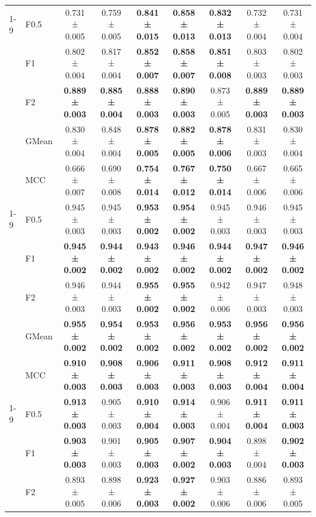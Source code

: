 \begin{table}[H]
{\begin{tabular}{llccccccc}
\cline{1-9}
\multirow[t]{5}{*}{GaussianNB} & F0.5 & 0.731 ± 0.005 & 0.759 ± 0.005 & \textbf{0.841 ± 0.015} & \textbf{0.858 ± 0.013} & \textbf{0.832 ± 0.013} & 0.732 ± 0.004 & 0.731 ± 0.004 \\
 & F1 & 0.802 ± 0.004 & 0.817 ± 0.004 & \textbf{0.852 ± 0.007} & \textbf{0.858 ± 0.007} & \textbf{0.851 ± 0.008} & 0.803 ± 0.003 & 0.802 ± 0.003 \\
 & F2 & \textbf{0.889 ± 0.003} & \textbf{0.885 ± 0.004} & \textbf{0.888 ± 0.003} & \textbf{0.890 ± 0.003} & 0.873 ± 0.005 & \textbf{0.889 ± 0.003} & \textbf{0.889 ± 0.003} \\
 & GMean & 0.830 ± 0.004 & 0.848 ± 0.004 & \textbf{0.878 ± 0.005} & \textbf{0.882 ± 0.005} & \textbf{0.878 ± 0.006} & 0.831 ± 0.003 & 0.830 ± 0.004 \\
 & MCC & 0.666 ± 0.007 & 0.690 ± 0.008 & \textbf{0.754 ± 0.014} & \textbf{0.767 ± 0.012} & \textbf{0.750 ± 0.014} & 0.667 ± 0.006 & 0.665 ± 0.006 \\
\cline{1-9}
\multirow[t]{5}{*}{LGBM()} & F0.5 & 0.945 ± 0.003 & 0.945 ± 0.003 & \textbf{0.953 ± 0.002} & \textbf{0.954 ± 0.002} & 0.945 ± 0.003 & 0.946 ± 0.003 & 0.945 ± 0.003 \\
 & F1 & \textbf{0.945 ± 0.002} & \textbf{0.944 ± 0.002} & \textbf{0.943 ± 0.002} & \textbf{0.946 ± 0.002} & \textbf{0.944 ± 0.002} & \textbf{0.947 ± 0.002} & \textbf{0.946 ± 0.002} \\
 & F2 & 0.946 ± 0.003 & 0.944 ± 0.003 & \textbf{0.955 ± 0.002} & \textbf{0.955 ± 0.002} & 0.942 ± 0.006 & 0.947 ± 0.003 & 0.948 ± 0.003 \\
 & GMean & \textbf{0.955 ± 0.002} & \textbf{0.954 ± 0.002} & \textbf{0.953 ± 0.002} & \textbf{0.956 ± 0.002} & \textbf{0.953 ± 0.002} & \textbf{0.956 ± 0.002} & \textbf{0.956 ± 0.002} \\
 & MCC & \textbf{0.910 ± 0.003} & \textbf{0.908 ± 0.003} & \textbf{0.906 ± 0.003} & \textbf{0.911 ± 0.003} & \textbf{0.908 ± 0.003} & \textbf{0.912 ± 0.004} & \textbf{0.911 ± 0.004} \\
\cline{1-9}
\multirow[t]{5}{*}{LogisticRegression()} & F0.5 & \textbf{0.913 ± 0.003} & 0.905 ± 0.003 & \textbf{0.910 ± 0.004} & \textbf{0.914 ± 0.003} & 0.906 ± 0.004 & \textbf{0.911 ± 0.004} & \textbf{0.911 ± 0.003} \\
 & F1 & \textbf{0.903 ± 0.003} & 0.901 ± 0.003 & \textbf{0.905 ± 0.003} & \textbf{0.907 ± 0.002} & \textbf{0.904 ± 0.003} & 0.898 ± 0.004 & \textbf{0.902 ± 0.003} \\
 & F2 & 0.893 ± 0.005 & 0.898 ± 0.006 & \textbf{0.923 ± 0.003} & \textbf{0.927 ± 0.002} & 0.903 ± 0.006 & 0.886 ± 0.006 & 0.893 ± 0.005 \\

\end{tabular}}
\end{table}
